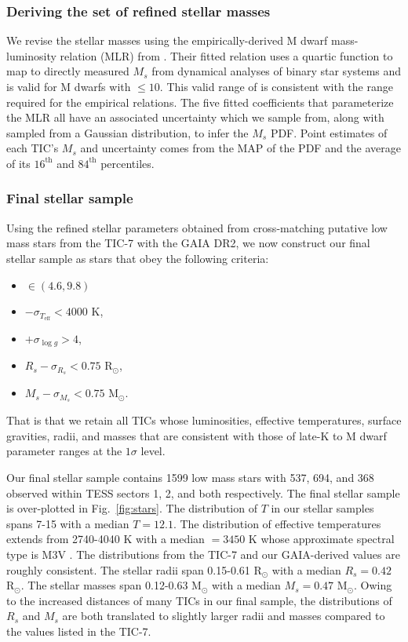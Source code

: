 \subsubsection{Deriving the set of refined stellar masses}
We revise the stellar masses using the empirically-derived M dwarf mass-luminosity relation (MLR) from  
\cite{benedict16}. Their fitted relation uses a quartic function to map \MK{} to directly measured $M_s$ from
dynamical analyses of binary star systems and is valid for M dwarfs with \MK{} $\leq 10$. This valid range of 
\MK{} is consistent with the range required for the \cite{mann15} empirical relations. The five fitted
coefficients that parameterize the MLR all have an associated uncertainty which we sample from, along with \MK{}
sampled from a Gaussian distribution, to infer the $M_s$ PDF. Point estimates of each TIC's $M_s$ and uncertainty
comes from the MAP of the PDF and the average of its $16^{\text{th}}$ and $84^{\text{th}}$ percentiles. 

\subsubsection{Final stellar sample}
Using the refined stellar parameters obtained from cross-matching putative low mass stars from the TIC-7 with
the GAIA DR2, we now construct our final stellar sample as stars that obey the following criteria:

\begin{itemize}
\item \MK{} $\in (4.6,9.8)$
\item \teff{} $- \sigma_{T_{\text{eff}}} < 4000$ K,
\item \logg{} $+ \sigma_{\log{g}}>4$,
\item $R_s -\sigma_{R_s} < 0.75$ R$_{\odot}$,
\item $M_s - \sigma_{M_s} < 0.75$ M$_{\odot}$.
\end{itemize}

\noindent That is that we retain all TICs whose luminosities, effective temperatures, surface
gravities, radii, and masses that are consistent with those of late-K to M dwarf parameter ranges
\citep{pecaut13} at the $1\sigma$ level.

Our final stellar sample contains 1599 low mass stars with 537, 694, and 368
observed within TESS sectors 1, 2, and both respectively.
The final stellar sample is over-plotted in Fig.~\ref{fig:stars}. The distribution of $T$
in our stellar samples spans 7-15 with a median $T=12.1$. The distribution of
effective temperatures extends from 2740-4040 K with a median \teff{} $=3450$ K
whose approximate spectral type is M3V \citep{pecaut13}. The \teff{} distributions from the TIC-7 and
our GAIA-derived values are roughly consistent. The stellar radii span 0.15-0.61 R$_{\odot}$
with a median $R_s=0.42$ R$_{\odot}$. The stellar masses span 0.12-0.63 M$_{\odot}$
with a median $M_s=0.47$ M$_{\odot}$. Owing to the increased distances of many TICs in our final sample,
the distributions of $R_s$ and $M_s$ are both translated to slightly larger radii and masses compared
to the values listed in the TIC-7.


